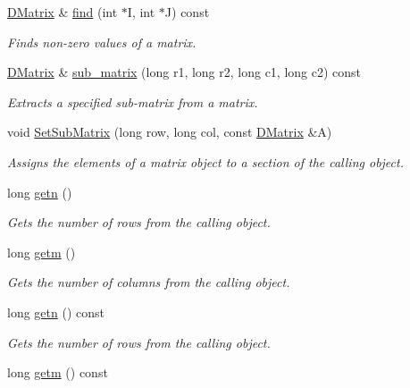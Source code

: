 \begin{DoxyCompactItemize}
\hyperlink{classDMatrix}{DMatrix} \& \hyperlink{classDMatrix_abf563652a938b64d2074d734584b738c}{find} (int $\ast$I, int $\ast$J) const 
\begin{DoxyCompactList}\small\item\em Finds non-\/zero values of a matrix. \item\end{DoxyCompactList}\item 
\hyperlink{classDMatrix}{DMatrix} \& \hyperlink{classDMatrix_a6c8455bfd3811abb82bca639f2ead3af}{sub\_\-matrix} (long r1, long r2, long c1, long c2) const 
\begin{DoxyCompactList}\small\item\em Extracts a specified sub-\/matrix from a matrix. \item\end{DoxyCompactList}\item 
void \hyperlink{classDMatrix_a580fc5ea46fe5208dd49a9f1ade06e20}{SetSubMatrix} (long row, long col, const \hyperlink{classDMatrix}{DMatrix} \&A)
\begin{DoxyCompactList}\small\item\em Assigns the elements of a matrix object to a section of the calling object. \item\end{DoxyCompactList}\item 
long \hyperlink{classDMatrix_ae9ea1cd2a83a4e84e072b62addd825cc}{getn} ()
\begin{DoxyCompactList}\small\item\em Gets the number of rows from the calling object. \item\end{DoxyCompactList}\item 
long \hyperlink{classDMatrix_a1954420b4966f38c5ed7e386648f087b}{getm} ()
\begin{DoxyCompactList}\small\item\em Gets the number of columns from the calling object. \item\end{DoxyCompactList}\item 
long \hyperlink{classDMatrix_a569af1f26034f5450d059637c9ea909e}{getn} () const 
\begin{DoxyCompactList}\small\item\em Gets the number of rows from the calling object. \item\end{DoxyCompactList}\item 
long \hyperlink{classDMatrix_a61fb36c4c0b342f7aabc0c709e761c26}{getm} () const 

\end{DoxyCompactItemize}
